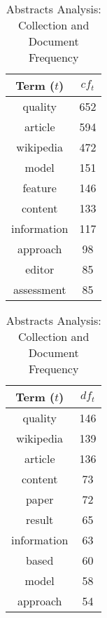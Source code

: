 \begin{table}[ht]
    \caption{Abstracts Analysis: Collection and Document Frequency}
    \label{tab:abstracts_analysis}
    \begin{minipage}{.325\textwidth}
        \centering
        \begin{tabular}{c c}
            \toprule
            Term ($t$) & $cf_t$ \\
            \midrule
            quality & 652 \\
            article & 594 \\
            wikipedia & 472 \\
            model & 151 \\
            feature & 146 \\
            content & 133 \\
            information & 117 \\
            approach & 98 \\
            editor & 85 \\
            assessment & 85 \\
            \bottomrule
        \end{tabular}
    \end{minipage}
    \begin{minipage}{.325\textwidth}
        \centering
        \begin{tabular}{c c}
            \toprule
            Term ($t$) & $df_t$ \\
            \midrule
            quality & 146 \\
            wikipedia & 139 \\
            article & 136 \\
            content & 73 \\
            paper & 72 \\
            result & 65 \\
            information & 63 \\
            based & 60 \\
            model & 58 \\
            approach & 54 \\
            \bottomrule
        \end{tabular}
    \end{minipage}
\end{table}
